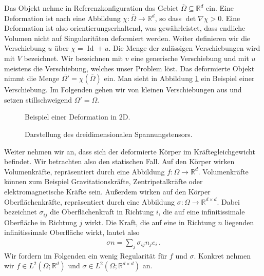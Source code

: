 \documentclass{scrartcl}
\def\R{\mathbb{R}}
\DeclareMathOperator{\Id}{Id}             %
\begin{document}
Das Objekt nehme in Referenzkonfiguration das Gebiet $\overline{\Omega}\subseteq\R^d$ ein. Eine Deformation ist nach \cite[S.276]{Bra-2007} eine Abbildung $\chi\colon\overline{\Omega}\to\R^d$, so dass $\det\nabla\chi>0$. Eine Deformation ist also orientierungserhaltend, was gewährleistet, dass endliche Volumen nicht auf Singularitäten deformiert werden. Weiter definieren wir die Verschiebung $u$ über $\chi=\Id+u$. Die Menge der zulässigen Verschiebungen wird mit $V$ bezeichnet. Wir bezeichnen mit $v$ eine generische Verschiebung und mit $u$ meistens die Verschiebung, welches unser Problem löst.
Das deformierte Objekt nimmt die Menge $\overline{\Omega'}=\chi(\overline{\Omega})$ ein. Man sieht in Abbildung \ref{dr:DefinitionVerschiebung} ein Beispiel einer Verschiebung. Im Folgenden gehen wir von kleinen Verschiebungen aus und setzen stillschweigend $\Omega'=\Omega$.
\begin{figure}[h]
\begin{minipage}[b]{0.47\textwidth}
\centering
\hspace*{1cm}

\caption{Beispiel einer Deformation in 2D.\label{dr:DefinitionVerschiebung}}
\end{minipage}
\hfill
\begin{minipage}[b]{0.48\textwidth}
\centering

\vspace*{0.05cm}
\caption{Darstellung des dreidimensionalen Spannungstensors.}
\end{minipage}
\end{figure}

Weiter nehmen wir an, dass sich der deformierte Körper im Kräftegleichgewicht befindet. Wir betrachten also den statischen Fall. Auf den Körper wirken Volumenkräfte, repräsentiert durch eine Abbildung $f\colon\Omega\to\R^d$. Volumenkräfte können zum Beispiel Gravitationskräfte, Zentripetalkräfte oder elektromagnetische Kräfte sein. Außerdem wirken auf den Körper Oberflächenkräfte, repräsentiert durch eine Abbildung $\sigma\colon\Omega\to\R^{d\times d}$. Dabei bezeichnet $\sigma_{ij}$ die Oberflächenkraft in Richtung $i$, die auf eine infinitissimale Oberfläche in Richtung $j$ wirkt. Die Kraft, die auf eine in Richtung $n$ liegenden infinitissimale Oberfläche wirkt, lautet also
\begin{align*}
	\sigma n=\sum_j\sigma_{ij}n_je_i\,.
\end{align*}
Wir fordern im Folgenden ein wenig Regularität für $f$ und $\sigma$. Konkret nehmen wir $f\in L^2(\Omega;\R^d)$ und $\sigma\in L^2(\Omega;\R^{d\times d})$ an.
\end{document}
